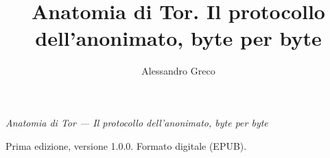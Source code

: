 \documentclass[11pt]{book}
\title{Anatomia di Tor. Il protocollo dell'anonimato, byte per byte}
\author{Alessandro Greco}
\date{}
\begin{document}
\frontmatter
\maketitle
{\small
\noindent \textit{Anatomia di Tor --- Il protocollo dell'anonimato, byte per byte}\par
\medskip
\DirittiLicenza
\medskip
\DirittiMarchi
\medskip
\noindent Prima edizione, versione 1.0.0. Formato digitale (EPUB).\par
}
\tableofcontents



\mainmatter


\backmatter
\printbibliography[heading=bibintoc,title={Bibliografia}]
\end{document}
